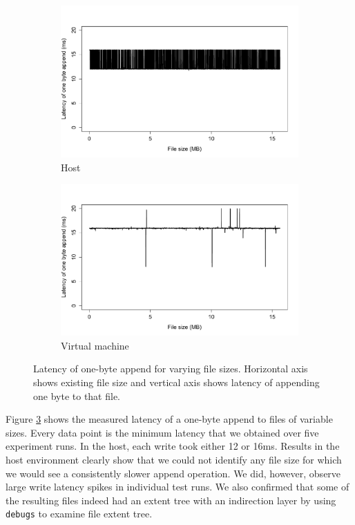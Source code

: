 \begin{figure}[t!]
    \begin{subfigure}[b]{0.5\textwidth}
		\includegraphics[width=1\textwidth]{./figures/p4_host.pdf}
		\caption{Host}
		\label{fig:p4host}
    \end{subfigure}
    \begin{subfigure}[b]{0.5\textwidth}
		\includegraphics[width=1\textwidth]{./figures/p4_vm.pdf}
		\caption{Virtual machine}
		\label{fig:p4vm}
    \end{subfigure}
	\caption{Latency of one-byte append for varying file sizes. Horizontal axis shows existing file size and vertical axis shows latency of appending one byte to that file.}
	\label{fig:p4}
\end{figure}


Figure \ref{fig:p4} shows the measured latency of a one-byte append to files of variable sizes. Every data point is the minimum latency that we obtained over five experiment runs. In the host, each write took either 12 or 16ms. Results in the host environment clearly show that we could not identify any file size for which we would see a consistently slower append operation. We did, however, observe large write latency spikes in individual test runs. We also confirmed that some of the resulting files indeed had an extent tree with an indirection layer by using \texttt{debugs} to examine file extent tree.

